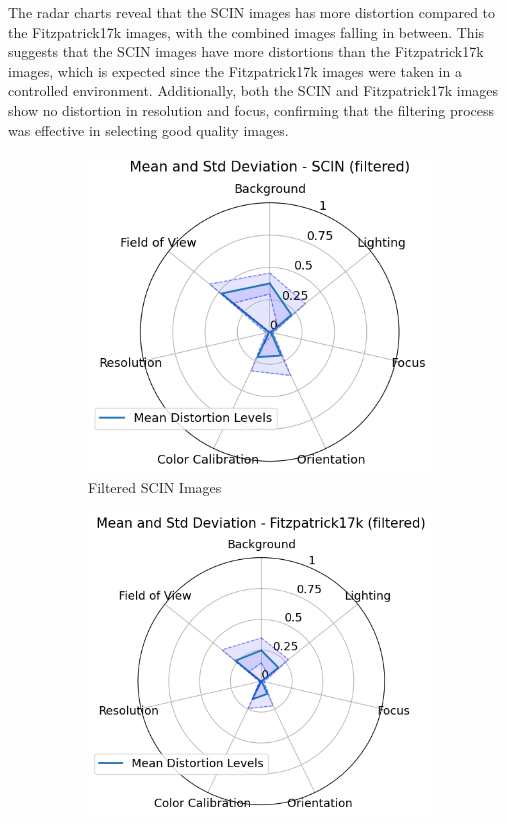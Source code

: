 \noindent
The radar charts reveal that the SCIN images has more distortion compared to the Fitzpatrick17k images, with the combined images falling in between. This suggests that the SCIN images have more distortions than the Fitzpatrick17k images, which is expected since the Fitzpatrick17k images were taken in a controlled environment. Additionally, both the SCIN and Fitzpatrick17k images show no distortion in resolution and focus, confirming that the filtering process was effective in selecting good quality images. \par
\begin{figure}[ht]
    \centering
    \begin{subfigure}[b]{0.32\textwidth}
        \includegraphics[width=\textwidth]{img/SCIN_hept.png}
        \caption{Filtered SCIN Images}
        \label{fig:scin_hept}
    \end{subfigure}
    \hfill
    \begin{subfigure}[b]{0.32\textwidth}
        \includegraphics[width=\textwidth]{img/F17K_hept.png}

\end{subfigure}
\end{figure}
